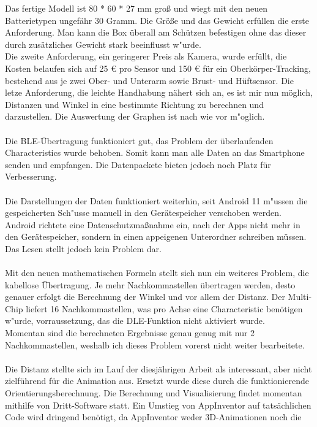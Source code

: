 Das fertige Modell ist 80 * 60 * 27 mm groß und wiegt mit den 
neuen Batterietypen ungefähr 30 Gramm. Die Größe und das Gewicht 
erfüllen die erste Anforderung. Man kann die Box überall am 
Schützen befestigen ohne das dieser durch zusätzliches Gewicht 
stark beeinflusst w"urde.\\
Die zweite Anforderung, ein geringerer Preis als Kamera, wurde erfüllt, die
Kosten belaufen sich auf 25 \euro{} pro Sensor und 150 \euro{} für ein 
Oberkörper-Tracking, bestehend aus je zwei Ober- und Unterarm sowie 
Brust- und Hüftsensor. Die letze Anforderung,
die leichte Handhabung nähert sich an, es ist mir nun möglich, Distanzen
und Winkel in eine bestimmte Richtung zu berechnen und darzustellen.
Die Auswertung der Graphen ist nach wie vor m"oglich.\\
\\
Die BLE-Übertragung funktioniert gut, das Problem der überlaufenden
Characteristics wurde behoben. Somit kann man alle Daten an das 
Smartphone senden und empfangen. Die Datenpackete bieten 
jedoch noch Platz für Verbesserung.\\
\\
Die Darstellungen der Daten funktioniert weiterhin, seit Android 11
m"ussen die gespeicherten Sch"usse manuell in den Gerätespeicher 
verschoben werden. Android richtete eine Datenschutzmaßnahme ein, 
nach der Apps nicht mehr in den Gerätespeicher, sondern in einen
appeigenen Unterordner schreiben müssen. Das Lesen stellt jedoch
kein Problem dar.\\
\\
Mit den neuen mathematischen Formeln stellt sich nun ein weiteres
Problem, die kabellose Übertragung. Je mehr Nachkommastellen übertragen
werden, desto genauer erfolgt die Berechnung der Winkel und vor allem 
der Distanz. Der Multi-Chip liefert 16 Nachkommastellen, was pro Achse
eine Characteristic benötigen w"urde, vorraussetzung, das die DLE-Funktion 
nicht aktiviert wurde.\\
Momentan sind die berechneten Ergebnisse genau genug mit nur 2 
Nachkommastellen, weshalb ich dieses Problem vorerst nicht weiter bearbeitete.\\
\\
Die Distanz stellte sich im Lauf der diesjährigen Arbeit als interessant, 
aber nicht zielführend für die Animation aus. Ersetzt wurde diese durch die funktionierende
Orientierungsberechnung. Die Berechnung und Visualisierung findet momentan 
mithilfe von Dritt-Software statt. Ein Umstieg von AppInventor auf tatsächlichen
Code wird dringend benötigt, da AppInventor weder 3D-Animationen noch die 
